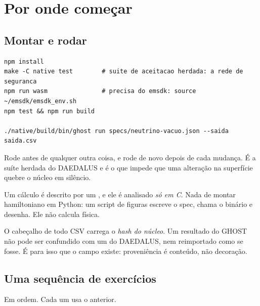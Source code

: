 \chapter{Por onde começar}

\section{Montar e rodar}

\begin{verbatim}
npm install
make -C native test        # suite de aceitacao herdada: a rede de seguranca
npm run wasm               # precisa do emsdk: source ~/emsdk/emsdk_env.sh
npm test && npm run build

./native/build/bin/ghost run specs/neutrino-vacuo.json --saida saida.csv
\end{verbatim}

Rode  antes de qualquer outra coisa, e rode de novo
depois de cada mudança. É a suíte herdada do DAEDALUS e é o que impede que uma
alteração na superfície quebre o núcleo em silêncio.

\begin{nota}
Um cálculo é descrito por um , e ele é analisado \emph{só em C}.
Nada de montar hamiltoniano em Python: um script de figuras escreve o spec,
chama o binário e desenha. Ele não calcula física.

\medskip
O cabeçalho de todo CSV carrega o \emph{hash do núcleo}. Um resultado do GHOST
não pode ser confundido com um do DAEDALUS, nem reimportado como se fosse. É
para isso que o campo existe: proveniência é conteúdo, não decoração.
\end{nota}

\section{Uma sequência de exercícios}

Em ordem. Cada um usa o anterior.

